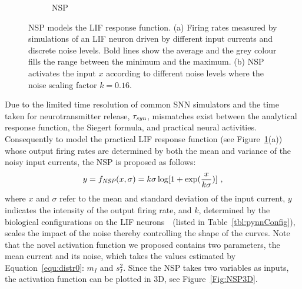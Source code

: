 \begin{figure}[bht!]
\begin{subfigure}[t]{0.7\textwidth}
			\caption{NSP}
		\end{subfigure}
		\caption[NSP models the LIF response function.]{
			NSP models the LIF response function.
			(a) Firing rates measured by simulations of an LIF neuron driven by different input currents and discrete noise levels.
			Bold lines show the average and the grey colour fills the range between the minimum and the maximum.
			(b) NSP activates the input $x$ according to different noise levels where the noise scaling factor $k=0.16$.}
		\label{fig:nsp}
	\end{figure}
	
	
	
	Due to the limited time resolution of common SNN simulators and the time taken for neurotransmitter release, $\tau_{\textit{\textrm{syn}}}$, mismatches exist between the analytical response function, the Siegert formula, and practical neural activities.
	Consequently to model the practical LIF response function (see Figure~\ref{fig:nsp}(a)) whose output firing rates are determined by both the mean and variance of the noisy input currents, the NSP is proposed as follows:
	\begin{equation}
	y = f_{\textit{\textrm{NSP}}}(x, \sigma) = k \sigma \log [1 + \exp(\frac{x}{k \sigma})]~,
	\label{equ:nsp}
	\end{equation}
	where $x$ and $\sigma$ refer to the mean and standard deviation of the input current, $y$ indicates the intensity of the output firing rate, and $k$, determined by the biological configurations on the LIF neurons~\citep{liu2016noisy}~(listed in Table~\ref{tbl:pynnConfig}), scales the impact of the noise thereby controlling the shape of the curves.
	Note that the novel activation function we proposed contains two parameters, the mean current and its noise, which takes the values estimated by Equation~\ref{equ:distr0}: $m_I$ and $s_I^2$.
	Since the NSP takes two variables as inputs, the activation function can be plotted in 3D, see Figure~\ref{Fig:NSP3D}.


